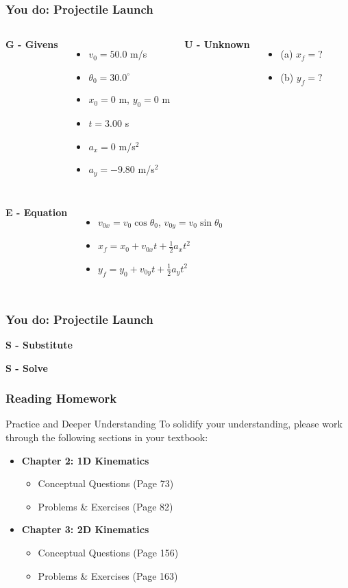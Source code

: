 \documentclass{beamer}
\begin{document}
\begin{frame}
\frametitle{You do: Projectile Launch}


\begin{columns}[T]
\textbf{G - Givens}
\begin{itemize}
\item $v_0 = 50.0$ m/s
\item $\theta_0 = 30.0^\circ$
\item $x_0 = 0$ m, $y_0 = 0$ m
\item $t = 3.00$ s
\item $a_x = 0$ m/s$^2$
\item $a_y = -9.80$ m/s$^2$
\end{itemize}
\pause
{}
\textbf{U - Unknown}
\begin{itemize}
\item (a) $x_f = ?$
\item (b) $y_f = ?$
\end{itemize}
\end{columns}
\pause
\begin{columns}[T]
\textbf{E - Equation}
\begin{itemize}
\item $v_{0x} = v_0 \cos\theta_0$, $v_{0y} = v_0 \sin\theta_0$
\item $x_f = x_0 + v_{0x}t + \frac{1}{2}a_x t^2$
\item $y_f = y_0 + v_{0y}t + \frac{1}{2}a_y t^2$
\end{itemize}
\end{columns}
\end{frame}

\begin{frame}
\frametitle{You do: Projectile Launch}
\textbf{S - Substitute}
\pause

\textbf{S - Solve}
\end{frame}

\begin{frame}
\frametitle{Reading Homework}
\begin{block}{Practice and Deeper Understanding}
To solidify your understanding, please work through the following sections in your textbook:
\end{block}
\begin{itemize}
    \item \textbf{Chapter 2: 1D Kinematics}
    \begin{itemize}
        \item Conceptual Questions (Page 73)
        \item Problems \& Exercises (Page 82)
    \end{itemize}
    \vfill
    \item \textbf{Chapter 3: 2D Kinematics}
    \begin{itemize}
        \item Conceptual Questions (Page 156)
        \item Problems \& Exercises (Page 163)
    \end{itemize}
\end{itemize}
\end{frame}
\end{document}
